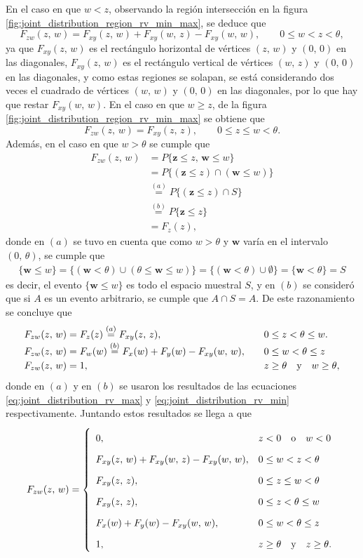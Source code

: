 \documentclass[a4paper]{report}
\newcommand{\w}{\mathbf{w}}
\newcommand{\z}{\mathbf{z}}
\begin{document}
En el caso en que \(w<z\), observando la región intersección en la figura \ref{fig:joint_distribution_region_rv_min_max}, se deduce que
\[
 F_{zw}(z,\,w)=F_{xy}(z,\,w)+F_{xy}(w,\,z)-F_{xy}(w,\,w),\qquad 0\leq w< z<\theta,
\]
ya que \(F_{xy}(z,\,w)\) es el rectángulo horizontal de vértices \((z,\,w)\) y \((0,\,0)\) en las diagonales, \(F_{xy}(z,\,w)\) es el rectángulo vertical de vértices \((w,\,z)\) y \((0,\,0)\) en las diagonales, y como estas regiones se solapan, se está considerando dos veces el cuadrado de vértices \((w,\,w)\) y \((0,\,0)\) en las diagonales, por lo que hay que restar \(F_{xy}(w,\,w)\). En el caso en que \(w\geq z\), de la figura \ref{fig:joint_distribution_region_rv_min_max} se obtiene que
\[
 F_{zw}(z,\,w)=F_{xy}(z,\,z),\qquad 0\leq z\leq w<\theta.
\]
Además, en el caso en que \(w>\theta\) se cumple que
\begin{align*}
  F_{zw}(z,\,w)&=P\{\z\leq z,\,\w\leq w\}\\
   &=P\{(\z\leq z)\cap(\w\leq w)\}\\
   &\overset{(a)}{=}P\{(\z\leq z)\cap S\}\\
   &\overset{(b)}{=}P\{\z\leq z\}\\
   &=F_z(z),
\end{align*}
donde en \((a)\) se tuvo en cuenta que como \(w>\theta\) y \(\w\) varía en el intervalo \((0,\,\theta)\), se cumple que
\begin{align*}
 \{\w\leq w\}=\{(\w<\theta)\cup(\theta\leq\w\leq w)\} = \{(\w<\theta)\cup\emptyset\} = \{\w<\theta\} = S
\end{align*}
es decir, el evento \(\{\w\leq w\}\) es todo el espacio muestral \(S\), y en \((b)\) se consideró que si \(A\)  es un evento arbitrario, se cumple que \(A\cap S=A\). De este razonamiento se concluye que
\[
\def\arraystretch{1.2}
 \begin{array}{lll}
  F_{zw}(z,\,w)=F_z(z)\overset{(a)}{=}F_{xy}(z,\,z), & & 0\leq z<\theta\leq w.\\
  F_{zw}(z,\,w)=F_w(w)\overset{(b)}{=}F_x(w)+F_y(w)-F_{xy}(w,\,w), & & 0\leq w<\theta\leq z\\
  F_{zw}(z,\,w)=1, & & z\geq\theta\quad\textrm{y}\quad w\geq\theta,
 \end{array}
\]
donde en \((a)\) y en \((b)\) se usaron los resultados de las ecuaciones \ref{eq:joint_distribution_rv_max} y \ref{eq:joint_distribution_rv_min} respectivamente.
Juntando estos resultados se llega a que
\begin{equation}\label{eq:joint_distribution_rv_min_max_aux}
 \def\arraystretch{1.8}
 F_{zw}(z,\,w)=\left\{\begin{array}{ll}
  0, & z<0\quad\textrm{o}\quad w<0 \\
  F_{xy}(z,\,w)+F_{xy}(w,\,z)-F_{xy}(w,\,w),& 0\leq w<z<\theta\\
  F_{xy}(z,\,z),& 0\leq z\leq w<\theta\\
  F_{xy}(z,\,z), & 0\leq z<\theta\leq w\\
  F_x(w)+F_y(w)-F_{xy}(w,\,w), & 0\leq w<\theta\leq z\\
  1, & z\geq\theta\quad\textrm{y}\quad z\geq\theta.
 \end{array} \right.
\end{equation}
\end{document}
